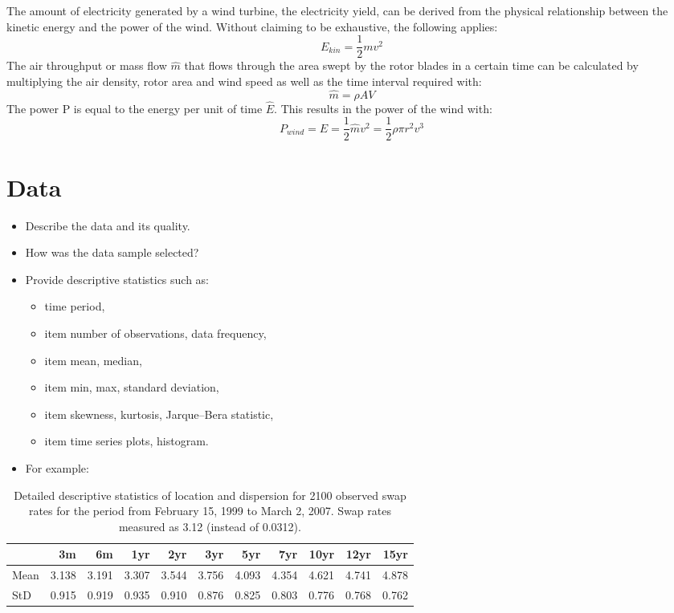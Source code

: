 \documentclass[a4paper,11pt]{article}
\begin{document}
The amount of electricity generated by a wind turbine, the electricity yield, can be derived from the physical relationship between the kinetic energy and the power of the wind. Without claiming to be exhaustive, the following applies:
\begin{equation}
E_{kin} = \frac{1}{2}mv^2
\end{equation}
The air throughput or mass flow \(\hat{m}\) that flows through the area swept by the rotor blades in a certain time can be calculated by multiplying the air density, rotor area and wind speed as well as the time interval required with:
\begin{equation}
\hat{m}=\rho A V
\end{equation}
The power P is equal to the energy per unit of time \(\hat{E}\). This results in the power of the wind with:
\begin{equation}
P_{wind}=\hat{E}=\frac{1}{2}\hat{m}v^2=\frac{1}{2} \rho \pi r^2 v^3
\end{equation}
\hypertarget{data}{%
\section{Data}\label{data}}
\begin{itemize}
\item
  Describe the data and its quality.
\item
  How was the data sample selected?
\item
  Provide descriptive statistics such as:
  \begin{itemize}
  \item
    time period,
  \item
    item number of observations, data frequency,
  \item
    item mean, median,
  \item
    item min, max, standard deviation,
  \item
    item skewness, kurtosis, Jarque--Bera statistic,
  \item
    item time series plots, histogram.
  \end{itemize}
\item
  For example:
\end{itemize}
\begin{table}[H]

\caption{\label{tab:table1}Detailed descriptive statistics of location and dispersion for 2100 observed swap rates for the period from February 15, 1999 to March 2, 2007. Swap rates measured as 3.12 (instead of 0.0312).}
\centering
\begin{tabular}[t]{lrrrrrrrrrr}
\toprule
  & 3m & 6m & 1yr & 2yr & 3yr & 5yr & 7yr & 10yr & 12yr & 15yr\\
\midrule
Mean & 3.138 & 3.191 & 3.307 & 3.544 & 3.756 & 4.093 & 4.354 & 4.621 & 4.741 & 4.878\\
StD & 0.915 & 0.919 & 0.935 & 0.910 & 0.876 & 0.825 & 0.803 & 0.776 & 0.768 & 0.762\\
\midrule
\bottomrule
\end{tabular}
\end{table}
\end{document}

